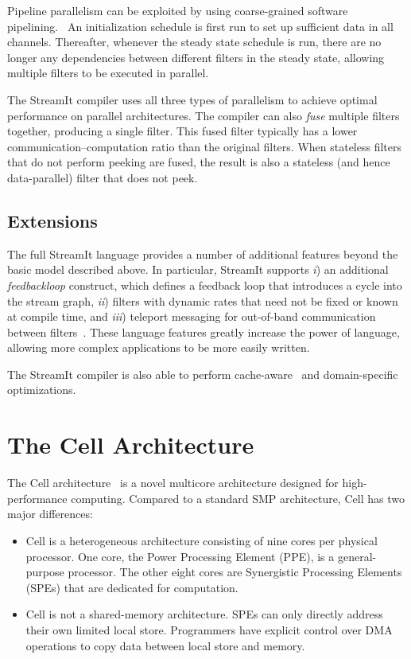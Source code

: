 Pipeline parallelism can be exploited by using coarse-grained software pipelining.~\cite{asplos06} An initialization schedule is first run to set up sufficient data in all channels. Thereafter, whenever the steady state schedule is run, there are no longer any dependencies between different filters in the steady state, allowing multiple filters to be executed in parallel.

The StreamIt compiler uses all three types of parallelism to achieve optimal performance on parallel architectures. The compiler can also \emph{fuse} multiple filters together, producing a single filter. This fused filter typically has a lower communication--computation ratio than the original filters. When stateless filters that do not perform peeking are fused, the result is also a stateless (and hence data-parallel) filter that does not peek.

\subsection{Extensions}

The full StreamIt language provides a number of additional features beyond the basic model described above. In particular, StreamIt supports \emph{i}) an additional \emph{feedbackloop} construct, which defines a feedback loop that introduces a cycle into the stream graph, \emph{ii}) filters with dynamic rates that need not be fixed or known at compile time, and \emph{iii}) teleport messaging for out-of-band communication between filters~\cite{messaging}. These language features greatly increase the power of language, allowing more complex applications to be more easily written.

The StreamIt compiler is also able to perform cache-aware~\cite{cacheopt} and domain-specific~\cite{linear03,linear05} optimizations.

\section{The Cell Architecture}\label{ch:bg:cell}

The Cell architecture~\cite{cell:website,cell:intro,cell:arch,cell:handbook} is a novel multicore architecture designed for high-performance computing. Compared to a standard SMP architecture, Cell has two major differences:
\begin{itemize}
\item Cell is a heterogeneous architecture consisting of nine cores per physical processor. One core, the Power Processing Element (PPE), is a general-purpose processor. The other eight cores are Synergistic Processing Elements (SPEs) that are dedicated for computation.
\item Cell is not a shared-memory architecture. SPEs can only directly address their own limited local store. Programmers have explicit control over DMA operations to copy data between local store and memory.
\end{itemize}

